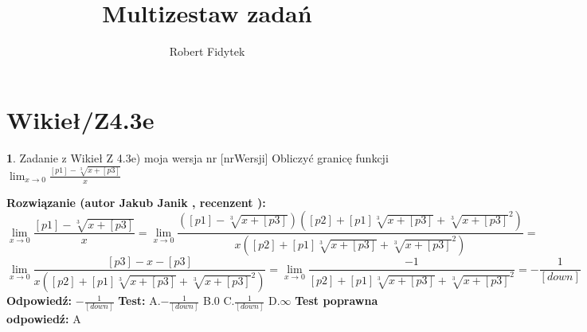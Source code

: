 \documentclass[12pt, a4paper]{article}
\title{Multizestaw zadań}
\author{Robert Fidytek}
\date{}
\theoremstyle{definition} %
\newtheorem{zad}{}
\newcommand{\kategoria}[1]{\section{#1}} %
\newcommand{\zadStart}[1]{\begin{zad}#1\newline} %
\newcommand{\zadStop}{\end{zad}}   %
\newcommand{\rozwStart}[2]{\noindent \textbf{Rozwiązanie (autor #1 , recenzent #2): }\newline} %
\newcommand{\rozwStop}{\newline}                                            %
\newcommand{\odpStart}{\noindent \textbf{Odpowiedź:}\newline}    %
\newcommand{\odpStop}{\newline}                                             %
\newcommand{\testStart}{\noindent \textbf{Test:}\newline} %
\newcommand{\testStop}{\newline} %
\newcommand{\kluczStart}{\noindent \textbf{Test poprawna odpowiedź:}\newline} %
\newcommand{\kluczStop}{\newline} %
\begin{document}
\maketitle


\kategoria{Wikieł/Z4.3e}
\zadStart{Zadanie z Wikieł Z 4.3e) moja wersja nr [nrWersji]}
Obliczyć granicę funkcji $\lim_{x \to 0} \frac{[p1]-\sqrt[3]{x+[p3]}}{x}$
\zadStop
\rozwStart{Jakub Janik}{}
$$\lim_{x \to 0} \frac{[p1]-\sqrt[3]{x+[p3]}}{x}=\lim_{x \to 0} \frac{([p1]-\sqrt[3]{x+[p3]})([p2]+[p1]\sqrt[3]{x+[p3]}+\sqrt[3]{x+[p3]}^2)}{x([p2]+[p1]\sqrt[3]{x+[p3]}+\sqrt[3]{x+[p3]}^2)}=$$
$$\lim_{x \to 0} \frac{[p3]-x-[p3]}{x([p2]+[p1]\sqrt[3]{x+[p3]}+\sqrt[3]{x+[p3]}^2)}=\lim_{x \to 0} \frac{-1}{[p2]+[p1]\sqrt[3]{x+[p3]}+\sqrt[3]{x+[p3]}^2}=-\frac{1}{[down]}$$
\rozwStop
\odpStart
$-\frac{1}{[down]}$
\odpStop
\testStart
A.$-\frac{1}{[down]}$
B.$0$
C.$\frac{1}{[down]}$
D.$\infty$
\testStop
\kluczStart
A
\kluczStop
\end{document}
